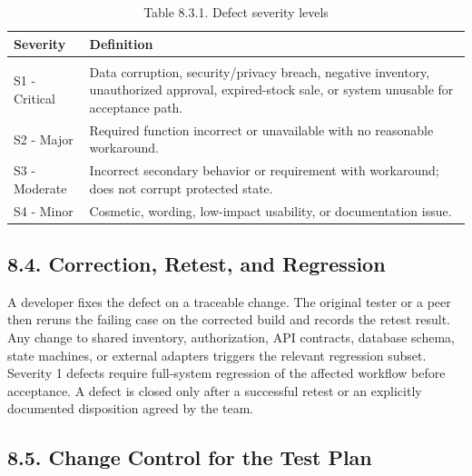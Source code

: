 {\def\LTcaptype{none} %
\begin{longtable}[]{|
  >{\raggedright\arraybackslash}m{}|
  >{\raggedright\arraybackslash}m{}|}
\hline
\begin{minipage}[c]{\linewidth}\raggedright
\textbf{Severity}
\end{minipage} & \begin{minipage}[c]{\linewidth}\raggedright
\textbf{Definition}
\end{minipage} \\
\hline
\endhead

\caption*{Table 8.3.1. Defect severity levels}\\
\endlastfoot
S1 - Critical & Data corruption, security/privacy breach, negative inventory, unauthorized approval, expired-stock sale, or system unusable for acceptance path. \\ \hline
S2 - Major & Required function incorrect or unavailable with no reasonable workaround. \\ \hline
S3 - Moderate & Incorrect secondary behavior or requirement with workaround; does not corrupt protected state. \\ \hline
S4 - Minor & Cosmetic, wording, low-impact usability, or documentation issue. \\ \hline
\end{longtable}
}

\subsection{8.4. Correction, Retest, and Regression}\label{correction-retest-and-regression}

A developer fixes the defect on a traceable change. The original tester or a peer then reruns the failing case on the corrected build and records the retest result. Any change to shared inventory, authorization, API contracts, database schema, state machines, or external adapters triggers the relevant regression subset. Severity 1 defects require full-system regression of the affected workflow before acceptance. A defect is closed only after a successful retest or an explicitly documented disposition agreed by the team.

\subsection{8.5. Change Control for the Test Plan}\label{change-control-for-the-test-plan}

